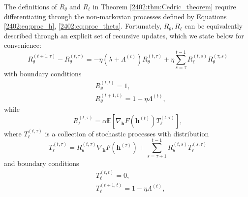 The definitions of $R_\theta$ and $R_\ell$ in Theorem \ref{2402:thm:Cedric_theorem} require differentiating through the non-markovian processes defined by Equations \ref{2402:eq:proc_h}, \ref{2402:eq:proc_theta}. Fortunately,  $R_\theta, R_\ell$ can be equivalently described through an explicit set of recursive updates, which we state below for convenience:
    \begin{equation}
        R_\theta^{(t+1, \tau)} - R_\theta^{(t, \tau)} = -  \eta  \left(\lambda + \Lambda^{(t)}\right)R_\theta^{(t, \tau)} + \eta \sum_{s=\tau}^{t-1}  R_\ell^{(t,s)} R_\theta^{(\tau, s)} 
    \end{equation}
    with boundary conditions
    \begin{align}
        &R_\theta^{(t, t)} = 1 , \\
        &R_\theta^{(t+1, t)} = 1 -  \eta  \Lambda^{(t)} ,
    \end{align}
while 
\begin{equation}
    R_\ell^{(t, \tau)} = \alpha\mathbb{E}\left[\nabla_{\boldsymbol{h}} F (\boldsymbol{h}^{(t)})  T_\ell^{(t, \tau)} \right],
\end{equation}
where $T_\ell^{(t, \tau)}$ is a collection of stochastic processes with distribution 
\begin{equation}
    T_\ell^{(t, \tau)} = R_\theta^{(t,\tau)}\nabla_{\boldsymbol{h}} F (\boldsymbol{h}^{(\tau)}) + \sum_{s=\tau+1}^{t-1} R_\theta^{(t,s)}  T_\ell^{(s, \tau)} 
\end{equation}
and boundary conditions
\begin{align}
    &T_\ell^{(t, t)} = 0 , \\
    &T_\ell^{(t+1, t)} = 1 -  \eta  \Lambda^{(t)} ,
\end{align}

